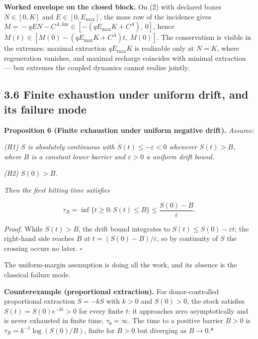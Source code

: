 \documentclass[11pt]{article}
\begin{document}
\textbf{Worked envelope on the closed block.} On (2) with declared boxes \(N \in [0, K]\) and \(E \in [0, E_{\max}]\), the mass row of the incidence gives \(\dot M =\allowbreak{} -qEN - C^{A,\allowbreak{}\mathrm{lim}} \in [-(qE_{\max}K +\allowbreak{} C^A),\allowbreak{}\,\allowbreak{} 0]\), hence \(M(t) \in [M(0) - (qE_{\max}K +\allowbreak{} C^A)t,\allowbreak{}\ M(0)]\). The conservatism is visible in the extremes: maximal extraction \(qE_{\max}K\) is realizable only at \(N=K\), where regeneration vanishes, and maximal recharge coincides with minimal extraction --- box extremes the coupled dynamics cannot realize jointly.

\subsection*{3.6 Finite exhaustion under uniform drift, and its failure mode}\label{36-finite-exhaustion-under-uniform-drift-and-its-failure-mode}

\textbf{Proposition 6 (Finite exhaustion under uniform negative drift).} \emph{Assume:}

\emph{(H1) \(S\) is absolutely continuous with \(\dot S(t) \le -\varepsilon < 0\) whenever \(S(t) > B\), where \(B\) is a constant lower barrier and \(\varepsilon > 0\) a uniform drift bound.}

\emph{(H2) \(S(0) > B\).}

\emph{Then the first hitting time satisfies} 

$$\tau_B = \inf\{ t \ge 0 : S(t) \le B \} \le \frac{S(0) - B}{\varepsilon}.$$



\emph{Proof.} While \(S(t) > B\), the drift bound integrates to \(S(t) \le S(0) - \varepsilon t\); the right-hand side reaches \(B\) at \(t = (S(0) - B)/\varepsilon\), so by continuity of \(S\) the crossing occurs no later. \(\square\)

The uniform-margin assumption is doing all the work, and its absence is the classical failure mode.

\textbf{Counterexample (proportional extraction).} For donor-controlled proportional extraction \(\dot S=-kS\) with \(k>0\) and \(S(0)>0\), the stock satisfies \(S(t)=S(0)e^{-kt}>0\) for every finite \(t\): it approaches zero asymptotically and is never exhausted in finite time, \(\tau_0=\infty\). The time to a positive barrier \(B > 0\) is \(\tau_B = k^{-1}\log(S(0)/B)\), finite for \(B > 0\) but diverging as \(B \to 0\).*
\end{document}
